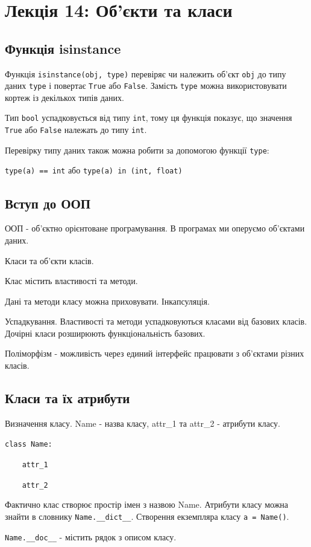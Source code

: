 \section{Лекція 14: Об’єкти та класи}
\subsection{Функція isinstance} 
\begin{frame}
Функція \texttt{isinstance(obj, type)} перевіряє чи належить об'єкт \texttt{obj} до типу даних \texttt{type} і повертає \texttt{True} або \texttt{False}. Замість \texttt{type} можна використовувати кортеж із декількох типів даних.

Тип \texttt{bool} успадковується від типу \texttt{int}, тому ця функція показує, що значення \texttt{True} або \texttt{False} належать до типу \texttt{int}.

Перевірку типу даних також можна робити за допомогою функції \texttt{type}:

\texttt{type(a) == int} або \texttt{type(a) in (int, float)}  


\end{frame}

\subsection{Вступ до ООП} 

\begin{frame}
ООП - об'єктно орієнтоване програмування. В програмах ми оперуємо об'єктами даних.

Класи та об'єкти класів.

Клас містить властивості та методи.

Дані та методи класу можна приховувати. Інкапсуляція.

Успадкування. Властивості та методи успадковуються класами від базових класів. Дочірні класи розширюють функціональність базових.

Поліморфізм - можливість через единий інтерфейс працювати з об'єктами різних класів.
\end{frame}

\subsection{Класи та їх атрибути} 
\begin{frame}
Визначення класу.
Name - назва класу, attr\_1 та attr\_2 - атрибути класу. 

\texttt{class Name:}

\texttt{~~~~attr\_1}

\texttt{~~~~attr\_2}

 Фактично клас створює простір імен з назвою Name. Атрибути класу можна знайти в словнику \texttt{Name.\_\_dict\_\_}. Створення екземпляра класу \texttt{a = Name()}.
 
 \texttt{Name.\_\_doc\_\_} - містить рядок з описом класу.
\end{frame}

